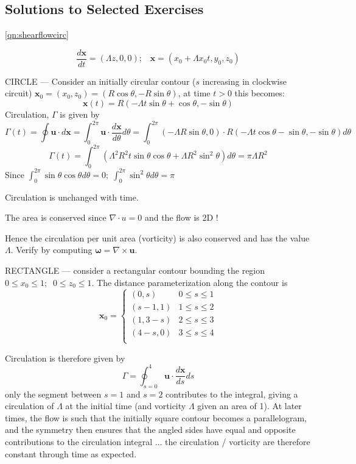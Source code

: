 \documentclass[10pt]{report}
\begin{document}

\begin{answer4}

\newpage

\section{Solutions to Selected Exercises}


\begin{questionnumber}{\ref{qn:shearflowcirc}}

\[
\frac{d{\bm x}}{dt} = (\Lambda z, 0, 0);\;\;\; {\bm x} = (x_{0} + \Lambda x_{0}t, y_{0}, z_{0})
\]

CIRCLE --- Consider an initially circular contour ($s$ increasing in clockwise circuit) $\bm x_{0} = (x_{0},z_{0}) = (R \cos\theta, -R\sin\theta)$, at time $t>0$ this becomes:
\[
  {\bm x}(t) = R ( -\Lambda t \sin\theta + \cos\theta, -\sin\theta )
\]
Circulation, $\Gamma$ is given by
\[
\Gamma(t) = \oint {\bm u}\cdot d{\bm x} = \int_{0}^{2\pi} {\bm u}\cdot \frac{d{\bm x}}{d\theta} d\theta =
      \int_{0}^{2\pi} (-\Lambda R \sin\theta, 0) \cdot R( -\Lambda t \cos\theta - \sin\theta, -\sin\theta) d\theta
\]
\[
\Gamma(t) =
      \int_{0}^{2\pi} \left(
      		\Lambda^{2} R^{2} t\sin\theta \cos\theta + \Lambda R^{2} \sin^{2}\theta
        			\right) d\theta
	      = \pi \Lambda R^{2}
 \]
Since $\int_{0}^{2\pi} \sin\theta\cos\theta d\theta =0;\; \int_{0}^{2\pi} \sin^{2}\theta d\theta = \pi$

Circulation is unchanged with time.

The area is conserved since $\nabla \cdot u = 0$ and the flow is 2D !

Hence the circulation per unit area (vorticity) is also conserved and has the value $\Lambda$.
Verify by computing ${\bm \omega} = \nabla \times {\bm u}$.

RECTANGLE --- consider a rectangular contour bounding the region $0 \le x_{0} \le 1;\;\; 0 \le z_{0} \le 1 $. The distance parameterization along the contour is
\[
	{\bm x}_{0} =
		\begin{cases}
		   (0,s)   & 0 \le s \le 1 \\
		   (s-1,1) & 1 \le s \le 2 \\
		   (1,3-s) & 2 \le s \le 3 \\
		   (4-s,0) & 3 \le s \le 4 \\
		\end{cases}
\]

Circulation is therefore given by
\[
    \Gamma = \oint_{s=0}^{4} {\bm u}\cdot \frac{d{\bm x}}{ds} ds
\]
only the segment between $s=1$ and $s=2$ contributes to the integral, giving a circulation of $\Lambda$ at
the initial time (and vorticity $\Lambda$ given an area of 1). At later times, the flow is such that the initially square contour becomes a parallelogram, and the symmetry then ensures that the angled sides have equal and opposite contributions to the circulation integral ... the circulation / vorticity are therefore constant through time as
expected.


\end{questionnumber}
\end{answer4}
\end{document}
